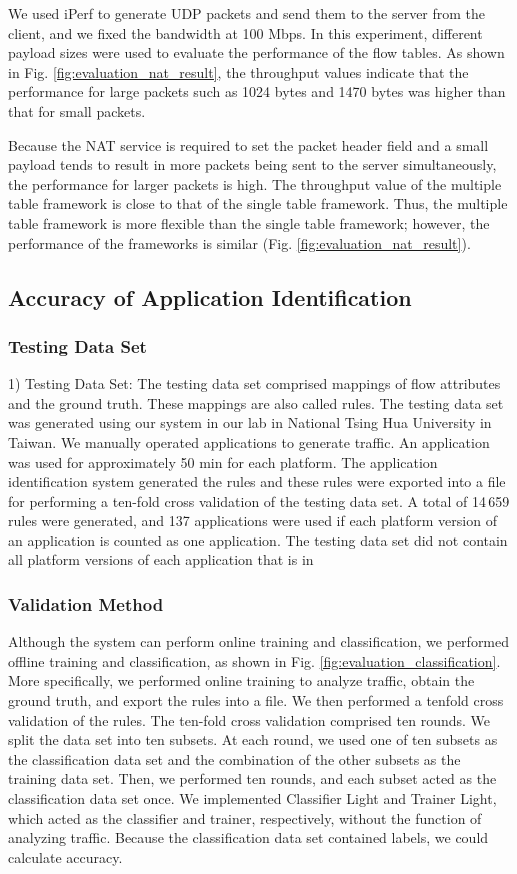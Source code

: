 \documentclass[journal]{IEEEtran}
\begin{document}
We used iPerf to generate UDP packets and send them to the server from the client, and we fixed the bandwidth at 100 Mbps. In this experiment, different payload sizes were used to evaluate the performance of the flow tables. As shown in Fig. \ref{fig:evaluation_nat_result}, the throughput values indicate that the performance for large packets such as 1024 bytes and 1470 bytes was higher than that for small packets.

Because the NAT service is required to set the packet header field and a small payload tends to result in more packets being sent to the server simultaneously, the performance for larger packets is high. The throughput value of the multiple table framework is close to that of the single table framework. Thus, the multiple table framework is more flexible than the single table framework; however, the performance of the frameworks is similar (Fig. \ref{fig:evaluation_nat_result}).



\subsection{Accuracy of Application Identification}
\subsubsection{Testing Data Set}
1)	Testing Data Set: The testing data set comprised mappings of flow attributes and the ground truth. These mappings are also called rules. The testing data set was generated using our system in our lab in National Tsing Hua University in Taiwan. We manually operated applications to generate traffic. An application was used for approximately 50 min for each platform. The application identification system generated the rules and these rules were exported into a file for performing a ten-fold cross validation of the testing data set. A total of 14 659 rules were generated, and 137 applications were used if each platform version of an application is counted as one application. The testing data set did not contain all platform versions of each application that is in

\subsubsection{Validation Method}
Although the system can perform online training and classification, we performed offline training and classification, as shown in Fig. \ref{fig:evaluation_classification}. More specifically, we performed online training to analyze traffic, obtain the ground truth, and export the rules into a file. We then performed a tenfold cross validation of the rules. The ten-fold cross validation comprised ten rounds. We split the data set into ten subsets. At each round, we used one of ten subsets as the classification data set and the combination of the other subsets as the training data set. Then, we performed ten rounds, and each subset acted as the classification data set once. We implemented Classifier Light and Trainer Light, which acted as the classifier and trainer, respectively, without the function of analyzing traffic. Because the classification data set contained labels, we could calculate accuracy.
\end{document}
